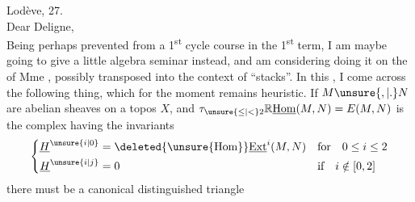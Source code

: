 
\noindent\hfill Lodève, 27.\\
Dear Deligne,\\
Being perhaps prevented   from  a 1\textsuperscript{st} cycle course in the 1\textsuperscript{st} term, I am maybe going to give a little algebra seminar instead, and am considering doing it on the  of Mme , possibly transposed into the context of ``stacks''. In this , I come across the following thing, which for the moment remains heuristic. If $M\unsure{,|.}N$ are  abelian sheaves on a topos $X$, and $\tau_{\unsure{\leq|<}2}\mathbb{R}\underline{\mathrm{Hom}}(M,N)=E(M,N)$ is the complex having the invariants
\[
\left\{\begin{aligned}
\underline{H}^{\unsure{i|0}} &= \deleted{\unsure{\mathrm{Hom}}}\underline{\mathrm{Ext}}^{i}(M,N)  && \text{for}\quad 0\leq i\leq 2\\
\underline{H}^{\unsure{i|j}} &= 0 && \text{if}\quad i\notin[0,2]
\end{aligned}\right.
\]
there must be a canonical distinguished triangle

